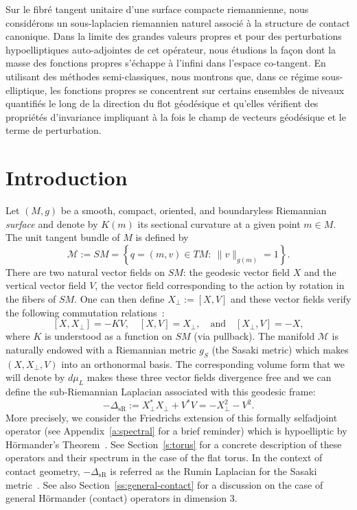 \documentclass[JEP,XML,SOM,Unicode, NoEqCountersInSection,published]{cedram}
\theoremstyle{plain}
\theoremstyle{definition}
\theoremstyle{remark}
\begin{document}
\begin{altabstract}
Sur le fibré tangent unitaire d'une surface compacte riemannienne, nous considérons un sous-laplacien riemannien naturel associé à la structure de contact canonique. Dans la limite des grandes valeurs propres et pour des perturbations hypoelliptiques auto-adjointes de cet opérateur, nous étudions la façon dont la masse des fonctions propres s'échappe à l'infini dans l'espace co-tangent. En utilisant des méthodes semi-classiques, nous montrons que, dans ce régime sous-elliptique, les fonctions propres se concentrent sur certains ensembles de niveaux quantifiés le long de la direction du flot géodésique et qu'elles vérifient des propriétés d'invariance impliquant à la fois le champ de vecteurs géodésique et le terme de perturbation.
\end{altabstract}

\maketitle
\vspace*{-\baselineskip}
\tableofcontents


\section{Introduction}

Let $(M,g)$ be a smooth, compact, oriented, and boundaryless Riemannian \emph{surface} and denote by $K(m)$ its sectional curvature at a given point $m\in M$. The unit tangent bundle of $M$ is defined by
\[
\mathcal{M}:=SM=\left\{q=(m,v)\in TM:\ \|v\|_{g(m)}=1\right\}.
\]
There are two natural vector fields on $SM$: the geodesic vector field $X$ and the vertical vector field $V$, \ie  the vector field corresponding to the action by rotation in the fibers of $SM$. One can then define $X_\perp:=[X,V]$ and these vector fields verify the following commutation relations~\cite[\S3.5.1]{PaternainSaloUhlmann22}:
\begin{equation}\label{e:commutators}
[X,X_\perp]= -KV,\quad [X,V]=X_\perp,\quad\text{and}\quad [X_\perp,V]=-X,
\end{equation}
where $K$ is understood as a function on $SM$ (via pullback). The manifold $\mathcal{M}$ is naturally endowed with a Riemannian metric $g_S$ (the Sasaki metric) which makes $(X,X_\perp,V)$ into an orthonormal basis. The corresponding volume form that we will denote by $d\mu_L$ makes these three vector fields divergence free and we can define the sub-Riemannian Laplacian associated with this geodesic frame:\enlargethispage{-\baselineskip}
\[
-\Delta_{\text{sR}}:=X_\perp^*X_\perp+V^*V=-X_\perp^2-V^2.
\]
More precisely, we consider the Friedrichs extension of this formally selfadjoint opera\-tor (see Appendix~\ref{a:spectral} for a brief reminder) which is hypoelliptic by Hörmander's Theorem~\cite[Th.\,1.1]{Hormander67}. See Section~\ref{s:torus} for a concrete description of these operators and their spectrum in the case of the flat torus. In the context of contact geometry, $-\Delta_{\text{sR}}$ is referred as the Rumin Laplacian for the Sasaki metric~\cite{Rumin1994}. See also Section~\ref{ss:general-contact} for a discussion on the case of general Hörmander (contact) operators in dimension $3$.
\end{document}
